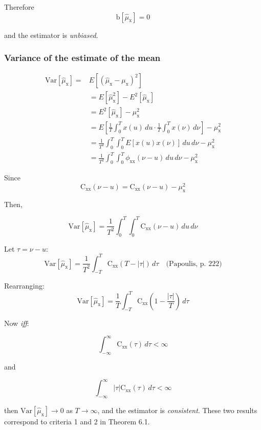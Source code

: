 \documentclass[12pt]{book}
\theoremstyle{definition}
\begin{document}
Therefore
\[
\text{b}[\hat{\mu}_\mathrm{x}] = 0
\]

and the estimator is \emph{unbiased}.

\subsubsection{Variance of the estimate of the mean}
\[
\begin{aligned}
 \text{Var}[\hat{\mu}_\mathrm{x}] = & E \left [ (\hat{\mu}_\mathrm{x} - \mu_\mathrm{x})^2 \right ] \\
        & = E [ \hat{\mu}^2_\mathrm{x}] - E^2[\hat{\mu}_\mathrm{x}] \\
        & = E^2[\hat{\mu}_\mathrm{x}] - {\mu}^2_\mathrm{x}\\
        & = E \left [ \frac{1}{T} \int_0^T x(u) \, du \cdot \frac{1}{T} \int_0^T x(\nu) \, d \nu \right ] - {\mu}^2_\mathrm{x}\\
        & = \frac{1}{T^2}  \int_0^T  \int_0^T E \left [  x(u) x(\nu) \right ] \, du \, d \nu   - {\mu}^2_\mathrm{x}\\
        & = \frac{1}{T^2}  \int_0^T  \int_0^T \phi_\mathrm{xx}(\nu-u) \, du \, d \nu   - {\mu}^2_\mathrm{x}
\end{aligned}
\]

Since \[
\mathrm{C}_\mathrm{xx}(\nu-u) = \mathrm{C}_\mathrm{xx}(\nu-u) - \mu^2_\mathrm{x}
\]

Then,

\[
\text{Var}[\hat{\mu}_\mathrm{x}] = \frac{1}{T^2}  \int_0^T  \int_0^T \mathrm{C}_\mathrm{xx}(\nu-u) \, du \, d \nu
\]

Let \( \tau = \nu - u\):
\[
\text{Var}[\hat{\mu}_\mathrm{x}] = \frac{1}{T^2}  \int_{-T}^T \mathrm{C}_\mathrm{xx} \left ( T - |\tau| \right ) \, d \tau  \quad \text{(Papoulis, p. 222)}
\]

Rearranging:
\[
\text{Var}[\hat{\mu}_\mathrm{x}] = \frac{1}{T}  \int_{-T}^T \mathrm{C}_\mathrm{xx} \left (1 - \frac{|\tau|}{T}  \right ) \, d \tau
\]

Now \emph{iff}:

\[
\int_{-\infty}^\infty \mathrm{C}_\mathrm{xx} (\tau) \, d \tau < \infty
\]

and

\[
\int_{-\infty}^\infty |\tau| \mathrm{C}_\mathrm{xx} (\tau) \, d \tau < \infty
\]

then $\text{Var}[\hat{\mu}_\mathrm{x}] \rightarrow 0$ as \(T \rightarrow \infty\), and the estimator is \emph{consistent}. These two results correspond to criteria 1 and 2 in Theorem 6.1.\\
\end{document}
